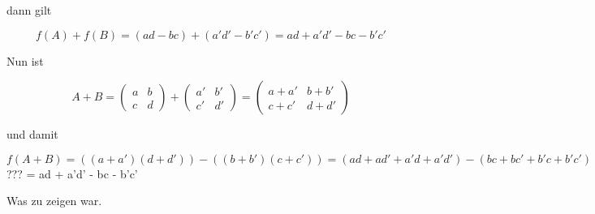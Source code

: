 \documentclass{article}
\begin{document}
dann gilt

\[
f(A)+f(B) = (ad - bc) + (a'd' - b'c')
          = ad + a'd' - bc - b'c'
\]

Nun ist

\[
A+B=
  \begin{pmatrix}
    a & b \\
    c & d
  \end{pmatrix}
  +
  \begin{pmatrix}
    a' & b' \\
    c' & d'
  \end{pmatrix}
  =
  \begin{pmatrix}
    a+a' & b+b' \\
    c+c' & d+d'
  \end{pmatrix}
\]

und damit

\[
f(A+B)= ((a+a')(d+d'))-((b+b')(c+c'))
      = (ad+ad'+a'd+a'd')-(bc+bc'+b'c+b'c')
\]
???      = ad + a'd' - bc - b'c'

Was zu zeigen war.
\end{document}
